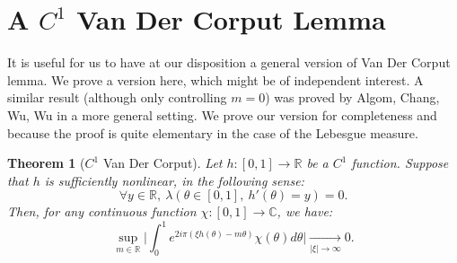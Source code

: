 \documentclass[11pt]{amsart}
\theoremstyle{plain}
\newtheorem{theorem}{Theorem}[section]
\theoremstyle{definition}
\numberwithin{equation}{section}
\begin{document}
\appendix

\section{A $C^1$ Van Der Corput Lemma}\label{ap:A}


It is useful for us to have at our disposition a general version of Van Der Corput lemma. We prove a version here, which might be of independent interest. A similar result (although only controlling $m = 0$) was proved by Algom, Chang, Wu, Wu \cite{ACWW} in a more general setting. We prove our version for completeness and because the proof is quite elementary in the case of the Lebesgue measure. 


\begin{theorem}[$C^{1}$ Van Der Corput]\label{thm:c1+alphavandercorput}
Let $h:[0,1] \rightarrow \mathbb{R}$ be a $C^{1}$ function. Suppose that $h$ is sufficiently nonlinear, in the following sense:
$$ \forall y \in \mathbb{R}, \ \lambda( \theta \in [0,1], \ h'(\theta)= y ) =0. $$
Then, for any continuous function $\chi:[0,1] \rightarrow \mathbb{C}$, we have:
$$   \sup_{m \in \mathbb{R}} \Big| \int_{0}^1 e^{2 i \pi (\xi h(\theta) - m \theta)} \chi(\theta) d\theta \Big| \underset{|\xi| \rightarrow \infty}{\longrightarrow} 0. $$
\end{theorem}
\end{document}

